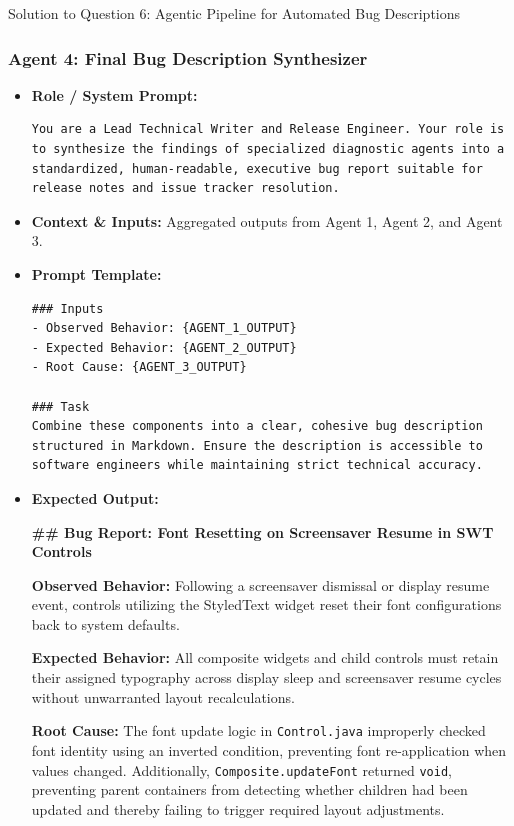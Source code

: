 \documentclass[11pt,a4paper]{article}
\begin{document}
\begin{solutionbox}{Solution to Question 6: Agentic Pipeline for Automated Bug Descriptions}
\subsubsection*{Agent 4: Final Bug Description Synthesizer}
\begin{itemize}[leftmargin=1.5em]
    \item \textbf{Role / System Prompt:}
\begin{lstlisting}[style=diffstyle]
You are a Lead Technical Writer and Release Engineer. Your role is to synthesize the findings of specialized diagnostic agents into a standardized, human-readable, executive bug report suitable for release notes and issue tracker resolution.
\end{lstlisting}
    \item \textbf{Context \& Inputs:} Aggregated outputs from Agent 1, Agent 2, and Agent 3.
    \item \textbf{Prompt Template:}
\begin{lstlisting}[style=diffstyle]
### Inputs
- Observed Behavior: {AGENT_1_OUTPUT}
- Expected Behavior: {AGENT_2_OUTPUT}
- Root Cause: {AGENT_3_OUTPUT}

### Task
Combine these components into a clear, cohesive bug description structured in Markdown. Ensure the description is accessible to software engineers while maintaining strict technical accuracy.
\end{lstlisting}
    \item \textbf{Expected Output:}
\begin{tcolorbox}[colback=white,colframe=secondary,arc=1mm,boxrule=0.6pt]
\textbf{\#\# Bug Report: Font Resetting on Screensaver Resume in SWT Controls}

\textbf{Observed Behavior:} Following a screensaver dismissal or display resume event, controls utilizing the StyledText widget reset their font configurations back to system defaults.

\textbf{Expected Behavior:} All composite widgets and child controls must retain their assigned typography across display sleep and screensaver resume cycles without unwarranted layout recalculations.

\textbf{Root Cause:} The font update logic in \texttt{Control.java} improperly checked font identity using an inverted condition, preventing font re-application when values changed. Additionally, \texttt{Composite.updateFont} returned \texttt{void}, preventing parent containers from detecting whether children had been updated and thereby failing to trigger required layout adjustments.
\end{tcolorbox}
\end{itemize}
\end{solutionbox}
\end{document}
